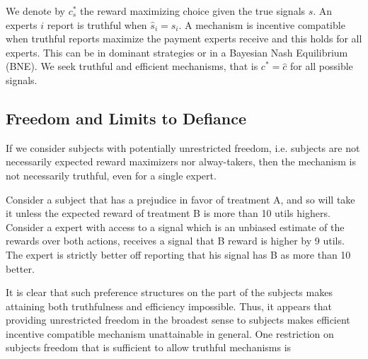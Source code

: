 We denote by $c^{*}_s$ the reward maximizing choice given the true signals $s$.
An experts $i$ report is truthful when $\hat{s}_i=s_i$. A mechanism is incentive compatible when truthful reports maximize the payment experts receive and this holds for all experts. This can be in dominant strategies or in a Bayesian Nash Equilibrium (BNE).  We seek truthful and efficient mechanisms, that is $c^{*} = \hat{c}$ for all possible signals.






\subsection{Freedom and Limits to Defiance}

If we consider subjects with potentially unrestricted freedom, i.e. subjects are not necessarily expected reward maximizers nor alway-takers, then the mechanism is not necessarily truthful, even for a single expert. 

\begin{eg}
	Consider a subject that has a prejudice in favor of treatment A, and so will take it unless the expected reward of treatment B is more than 10 utils highers. Consider a expert with access to a signal which is an unbiased estimate of the rewards over both actions, receives a signal  that B reward is higher by 9 utils. The expert is strictly better off reporting that his signal has B as more than 10 better.
\end{eg}



It is clear that such preference structures on the part of the subjects makes attaining both truthfulness and efficiency impossible. 
Thus, it appears that providing unrestricted freedom in the broadest sense to subjects makes efficient incentive compatible mechanism unattainable in general.
One restriction on subjects freedom that is sufficient to allow truthful mechanisms is 

